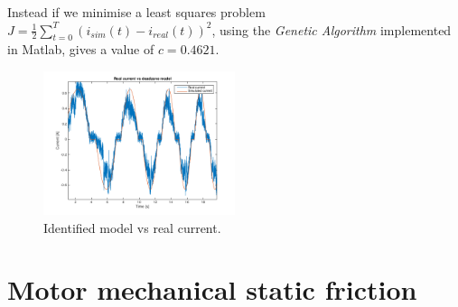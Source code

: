 Instead if we minimise a least squares problem $J = \frac{1}{2} \sum_{t=0}^T (i_{sim}(t) -i_{real}(t))^2$, using the \emph{Genetic Algorithm} implemented in Matlab, gives a value of $c =0.4621$.
  \begin{figure}[!h]
  \centering
  \includegraphics[width=0.5\textwidth]{img/deadzone3.png}
  \caption{Identified model vs real current.}
    \label{fig:deadzone_sim}
\end{figure}
\section{Motor mechanical static friction}

